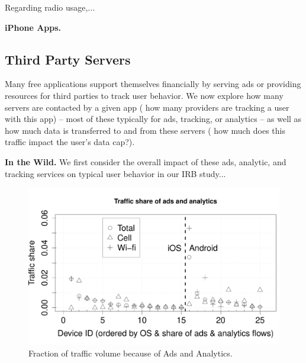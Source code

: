     Regarding radio usage,...

  {\bf iPhone Apps.}

\subsection{Third Party Servers}
  Many free applications support themselves financially by serving ads or providing resources for third parties to track user behavior.
  We now explore how many servers are contacted by a given app (\ie{} how many providers are tracking a user with this app) -- most of these typically for ads, tracking, or analytics -- as well as how much data is transferred to and from these servers (\ie{} how much does this traffic impact the user's data cap?).

  {\bf In the Wild.}
  We first consider the overall impact of these ads, analytic, and tracking services on typical user behavior in our IRB study...

\begin{figure}[t]
\includegraphics[width=\columnwidth]{plots/ad_share_bytes.pdf}
\caption{Fraction of traffic volume because of Ads and Analytics. \emph{}}
\label{fig:description}
\end{figure}

